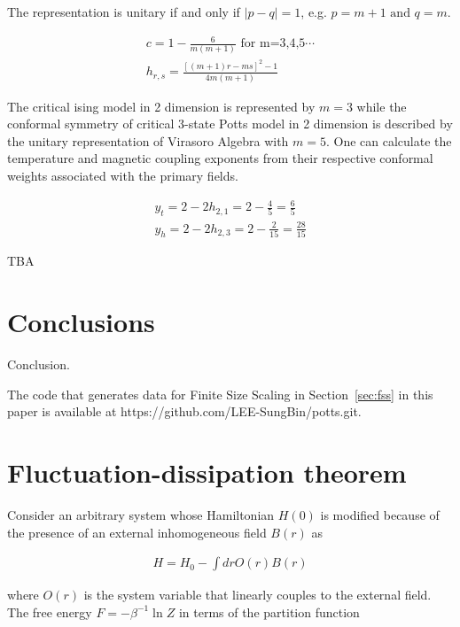 \documentclass[%
 reprint,
 amsmath,amssymb,
 aps,
]{revtex4-2}
\begin{document}
The representation is unitary if and only if $|p-q|=1$, e.g. $p=m+1 \text{ and }q = m$.

\begin{gather}
c=1-\frac{6}{m(m+1)} \text{ for m=3,4,5} \dotsb \\
h_{r,s} = \frac{\left[(m+1)r-ms\right]^2-1}{4m(m+1)}
\end{gather}

The critical ising model in 2 dimension is represented by $m=3$ while the conformal symmetry 
of critical 3-state Potts model in 2 dimension is described by the unitary representation 
of Virasoro Algebra with $m=5$. One can calculate the temperature and magnetic coupling 
exponents from their respective conformal weights associated with the primary fields.

\begin{gather}
y_{t} = 2 - 2h_{2,1} = 2 - \frac{4}{5} = \frac{6}{5} \\
y_{h} = 2 - 2h_{2,3} = 2 - \frac{2}{15} = \frac{28}{15}
\end{gather}

TBA

\section{Conclusions}
Conclusion.


\begin{acknowledgments}
The code that generates data for Finite Size Scaling in Section~\ref{sec:fss} in this paper
is available at https://github.com/LEE-SungBin/potts.git.
\end{acknowledgments}

\appendix

\section{\label{appx:fluc}Fluctuation-dissipation theorem}
Consider an arbitrary system whose Hamiltonian $H(0)$ is modified because of the presence of 
an external inhomogeneous field $B(r)$ as

\begin{eqnarray}
H = H_{0} -\int dr O(r)B(r)
\end{eqnarray}

where $O(r)$ is the system variable that linearly couples to the external field. The free 
energy $F = -\beta^{-1} \ln Z$ in terms of the partition function
\end{document}
